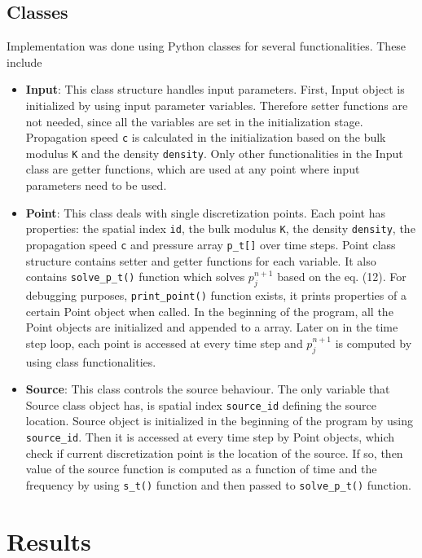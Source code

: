 \documentclass[]{article}
\begin{document}
\subsection{Classes}
Implementation was done using Python classes for several functionalities. These include
\begin{itemize}
	\item \textbf{Input}: This class structure handles input parameters. First, Input object is initialized by using input parameter variables. Therefore setter functions are not needed, since all the variables are set in the initialization stage. Propagation speed \texttt{c} is calculated in the initialization based on the bulk modulus \texttt{K} and the density \texttt{density}. Only other functionalities in the Input class are getter functions, which are used at any point where input parameters need to be used. 
	
	\item \textbf{Point}: This class deals with single discretization points. Each point has properties: the spatial index \texttt{id}, the bulk modulus \texttt{K}, the density \texttt{density}, the propagation speed \texttt{c} and pressure array \texttt{p\_t[]} over time steps. Point class structure contains setter and getter functions for each variable. It also contains \texttt{solve\_p\_t()} function which solves $p^{n+1}_j$ based on the eq. (12). For debugging purposes, \texttt{print\_point()} function exists, it prints properties of a certain Point object when called. In the beginning of the program, all the Point objects are initialized and appended to a array. Later on in the time step loop, each point is accessed at every time step and $p^{n+1}_j$ is computed by using class functionalities.
	
	\item \textbf{Source}: This class controls the source behaviour. The only variable that Source class object has, is spatial index \texttt{source\_id} defining the source location. Source object is initialized in the beginning of the program by using \texttt{source\_id}. Then it is accessed at every time step by Point objects, which check if current discretization point is the location of the source. If so, then value of the source function is computed as a function of time and the frequency by using \texttt{s\_t()} function and then passed to \texttt{solve\_p\_t()} function.
\end{itemize}

\section{Results}
\end{document}
